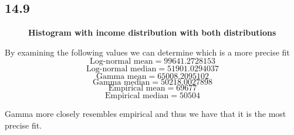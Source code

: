 \documentclass[letterpaper,12pt]{article}
\theoremstyle{definition}
\begin{document}
\subsection*{14.9}



\begin{figure}[htb]\centering \captionsetup{width=4.0in}
        \caption{\label{Histogram<800}\textbf{Histogram with income distribution with both distributions}}
\end{figure}

By examining the following values we can determine which is a more precise fit\\
\[\text{Log-normal mean} =  99641.2728153\]
\[\text{Log-normal median} =  51901.0294037\]
\[\text{Gamma mean} =  65008.2095102\]
\[\text{Gamma median} =  50218.0027898\]
\[\text{Empirical mean} =  69677\]
\[\text{Empirical median} =  50504\]

Gamma more closely resembles empirical and thus we have that it is the most precise fit.
\end{document}
